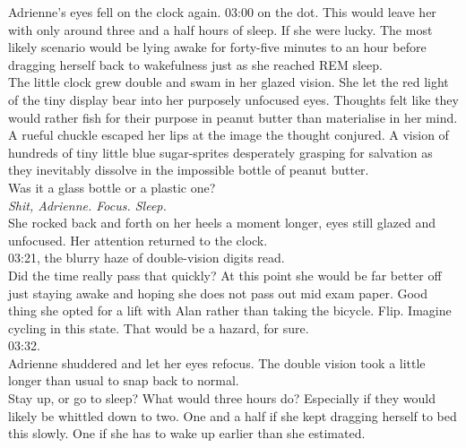Adrienne's eyes fell on the clock again. 
03:00 on the dot. 
This would leave her with only around three and a half hours of sleep. 
If she were lucky.
The most likely scenario would be lying awake for forty-five minutes to an hour before dragging herself back to wakefulness just as she reached REM sleep.\\

The little clock grew double and swam in her glazed vision.
She let the red light of the tiny display bear into her purposely unfocused eyes.
Thoughts felt like they would rather fish for their purpose in peanut butter than materialise in her mind.\\

A rueful chuckle escaped her lips at the image the thought conjured.
A vision of hundreds of tiny little blue sugar-sprites desperately grasping for salvation as they inevitably dissolve in the impossible bottle of peanut butter.\\

Was it a glass bottle or a plastic one?\\

\textit{Shit, Adrienne. Focus. Sleep.}\\

She rocked back and forth on her heels a moment longer, eyes still glazed and unfocused.
Her attention returned to the clock.\\

03:21, the blurry haze of double-vision digits read.\\

Did the time really pass that quickly?
At this point she would be far better off just staying awake and hoping she does not pass out mid exam paper.
Good thing she opted for a lift with Alan rather than taking the bicycle.
Flip.
Imagine cycling in this state.
That would be a hazard, for sure.\\

03:32.\\

Adrienne shuddered and let her eyes refocus.
The double vision took a little longer than usual to snap back to normal.\\

Stay up, or go to sleep?
What would three hours do? 
Especially if they would likely be whittled down to two. 
One and a half if she kept dragging herself to bed this slowly.
One if she has to wake up earlier than she estimated.\\

